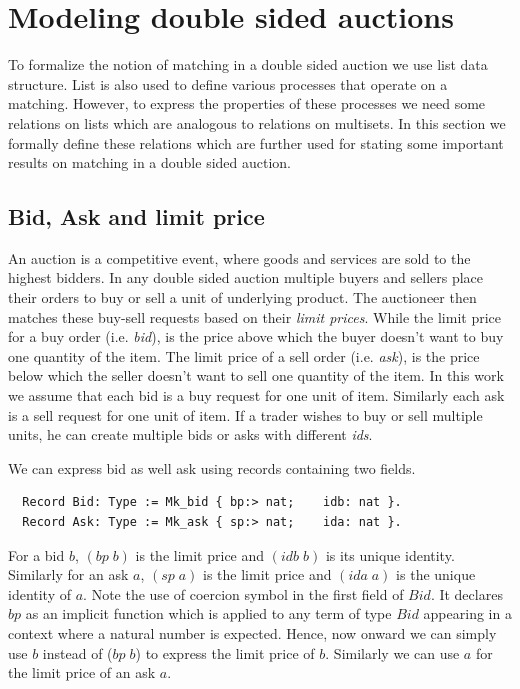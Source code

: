 \documentclass[a4paper,UKenglish,cleveref, autoref]{lipics-v2019}
\begin{document}
\section{Modeling double sided auctions}\label{sec:modeling}
To formalize the notion of matching in a double sided auction we use  list data structure.  List is also used to define various processes that operate on  a matching. However, to express the properties of these processes we need some  relations on lists which are analogous to  relations on multisets. In this section we formally define these relations which are further used for stating some important results on matching in a double sided auction.

\subsection{Bid, Ask and limit price}
An auction is a  competitive event, where goods and services are sold to the highest bidders. In  any double sided auction multiple buyers and sellers place their orders to buy or sell a unit of underlying product. The  auctioneer then matches these buy-sell requests  based on their \emph{limit prices}. While the limit price for a buy order (i.e. \emph{bid}), is the price above which the buyer doesn't want to buy one quantity of the item. The limit price of a sell order (i.e. \emph{ask}), is the price below which the seller doesn't want to sell one quantity of the item.  In this work we assume that each bid is a buy request for one unit of item. Similarly each ask is a sell request for one unit of item. If a trader wishes to buy or sell multiple units, he can create multiple bids or asks with different \emph{ids}. 

We can express bid as well ask using  records containing two fields. 
\begin{verbatim}
  Record Bid: Type := Mk_bid { bp:> nat;    idb: nat }.
  Record Ask: Type := Mk_ask { sp:> nat;    ida: nat }.
\end{verbatim}
For a bid $b$, $(bp \; b)$  is the limit price and $(idb \; b)$ is its unique identity. Similarly for an ask $a$, $(sp \; a)$ is the limit price and $(ida \; a)$ is the unique identity of $a$. Note the use of coercion symbol \tw{ :>} in the first field of $Bid$. It declares $bp$ as an implicit function which is applied  to any term of type $Bid$ appearing in a context where a natural number is expected. Hence, now onward we can simply use $b$ instead of  ($bp \;b$) to express the limit price of $b$. Similarly we can use $a$ for the limit price of an ask $a$.
\end{document}
